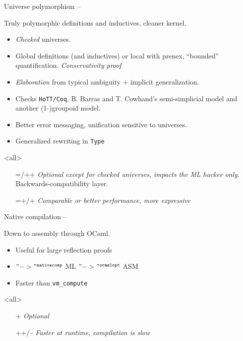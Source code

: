 \begin{subsecframe}{Universe polymorphism -- }
  \begin{center}
    Truly polymorphic definitions and inductives, cleaner kernel. 
  \end{center}
  
  \begin{itemize}
  \item \emph{Checked} universes.
  \item Global definitions (and inductives) or local with prenex, ``bounded''
    quantification. \emph{Conservativity proof}
  \item \emph{Elaboration} from typical ambiguity + implicit
    generalization.
  \item Checks \texttt{HoTT/Coq}, B. Barras and T. Cowhand's semi-simplicial
    model and another (1-)groupoid model.
  \item Better error messaging, unification sensitive to universes.
  \item Generalized rewriting in \alert{\texttt{Type}}
  \end{itemize}
  \mode<all>

  \begin{itemize}
  \item[=/++] \emph{Optional except for checked
      universes, impacts the ML hacker only}. Backwards-compatibility layer.
  \item[=+/+] \emph{Comparable or better performance, more expressive}
  \end{itemize}
\end{subsecframe}

\begin{subsecframe}{Native compilation -- }
  \begin{center}
    Down to assembly through OCaml.
  \end{center}

  \begin{itemize}
  \item Useful for large reflection proofs
  \item \Coq $"->"^{\texttt{nativecomp}}$ \textsc{ML} $"->"^{\texttt{ocamlopt}}$ \textsc{ASM}
  \item Faster than \texttt{vm\_compute}
  \end{itemize}
  \mode<all>

  \begin{itemize}
  \item[+] \emph{Optional}
  \item[++/--] \emph{Faster at runtime, compilation is slow}
  \end{itemize}
\end{subsecframe}

